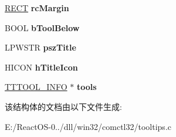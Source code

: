\begin{DoxyCompactItemize}
\hyperlink{structtag_r_e_c_t}{R\+E\+CT} {\bfseries rc\+Margin}
\item 
\mbox{\label{struct_t_o_o_l_t_i_p_s___i_n_f_o_a389e37867813c19ffd1bb66eb81acc5e}} 
B\+O\+OL {\bfseries b\+Tool\+Below}
\item 
\mbox{\label{struct_t_o_o_l_t_i_p_s___i_n_f_o_aceee6f333d59b8171bbb005d68ab0864}} 
L\+P\+W\+S\+TR {\bfseries psz\+Title}
\item 
\mbox{\label{struct_t_o_o_l_t_i_p_s___i_n_f_o_a18cca26d79735806ed60b5f2dfd54c37}} 
H\+I\+C\+ON {\bfseries h\+Title\+Icon}
\item 
\mbox{\label{struct_t_o_o_l_t_i_p_s___i_n_f_o_aa387e718ceacd48845caafb40012feac}} 
\hyperlink{struct_t_t_t_o_o_l___i_n_f_o}{T\+T\+T\+O\+O\+L\+\_\+\+I\+N\+FO} $\ast$ {\bfseries tools}
\end{DoxyCompactItemize}


该结构体的文档由以下文件生成\+:\begin{DoxyCompactItemize}
\item 
E\+:/\+React\+O\+S-\/0../dll/win32/comctl32/tooltips.\+c\end{DoxyCompactItemize}
